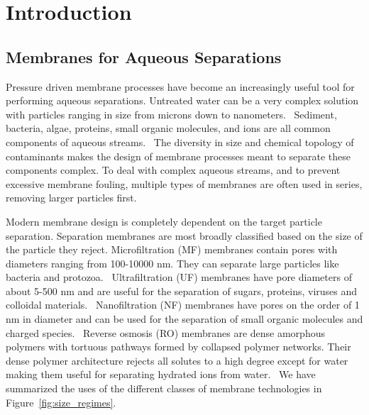 \chapter{Introduction}\label{chapter:intro}

  \section{Membranes for Aqueous Separations}
  
  Pressure driven membrane processes have become an increasingly useful tool for
  performing aqueous separations. Untreated water can be a very complex solution
  with particles ranging in size from microns down to nanometers.~\cite{goosen_fouling_2005}
  Sediment, bacteria, algae, proteins, small organic molecules, and ions
  are all common components of aqueous streams.~\cite{werber_materials_2016}
  The diversity in size and chemical topology of contaminants makes the design of
  membrane processes meant to separate these components complex. To deal with 
  complex aqueous streams, and to prevent excessive membrane fouling, multiple 
  types of membranes are often used in series, removing larger particles 
  first.~\cite{suk_membranebased_2006}

  Modern membrane design is completely dependent on the target particle 
  separation. Separation membranes are most broadly classified based on the size of 
  the particle they reject. Microfiltration (MF) membranes contain pores with 
  diameters ranging from 100-10000 nm. They can separate large particles like 
  bacteria and protozoa.~\cite{ma_functionalized_2014} Ultrafiltration (UF) 
  membranes have pore diameters of about 5-500 nm and are useful for the separation
  of sugars, proteins, viruses and colloidal materials.~\cite{yanful_ultrafiltration_2009}
  Nanofiltration (NF) membranes have pores on the order of 1 nm in diameter and can 
  be used for the separation of small organic molecules and charged species.~\cite{van_der_bruggen_review_2003}
  Reverse osmosis (RO) membranes are dense amorphous polymers with tortuous 
  pathways formed by collapsed polymer networks. Their dense polymer architecture 
  rejects all solutes to a high degree except for water making them useful for 
  separating hydrated ions from water.~\cite{warsinger_review_2018} We have 
  summarized the uses of the different classes of membrane technologies in 
  Figure~\ref{fig:size_regimes}.
  
